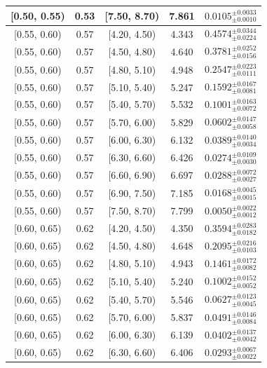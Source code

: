 \begin{longtable}{|c|c|c|c|c|}
\hline
[0.50, 0.55) & 0.53 & [7.50, 8.70) & 7.861 & $0.0105^{ \pm 0.0033 }_{ \pm 0.0010 }$ \\ 
\hline
[0.55, 0.60) & 0.57 & [4.20, 4.50) & 4.343 & $0.4574^{ \pm 0.0344 }_{ \pm 0.0224 }$ \\ 
\hline
[0.55, 0.60) & 0.57 & [4.50, 4.80) & 4.640 & $0.3781^{ \pm 0.0252 }_{ \pm 0.0156 }$ \\ 
\hline
[0.55, 0.60) & 0.57 & [4.80, 5.10) & 4.948 & $0.2547^{ \pm 0.0223 }_{ \pm 0.0111 }$ \\ 
\hline
[0.55, 0.60) & 0.57 & [5.10, 5.40) & 5.247 & $0.1592^{ \pm 0.0167 }_{ \pm 0.0081 }$ \\ 
\hline
[0.55, 0.60) & 0.57 & [5.40, 5.70) & 5.532 & $0.1001^{ \pm 0.0163 }_{ \pm 0.0072 }$ \\ 
\hline
[0.55, 0.60) & 0.57 & [5.70, 6.00) & 5.829 & $0.0602^{ \pm 0.0147 }_{ \pm 0.0058 }$ \\ 
\hline
[0.55, 0.60) & 0.57 & [6.00, 6.30) & 6.132 & $0.0389^{ \pm 0.0140 }_{ \pm 0.0034 }$ \\ 
\hline
[0.55, 0.60) & 0.57 & [6.30, 6.60) & 6.426 & $0.0274^{ \pm 0.0109 }_{ \pm 0.0030 }$ \\ 
\hline
[0.55, 0.60) & 0.57 & [6.60, 6.90) & 6.697 & $0.0288^{ \pm 0.0072 }_{ \pm 0.0027 }$ \\ 
\hline
[0.55, 0.60) & 0.57 & [6.90, 7.50) & 7.185 & $0.0168^{ \pm 0.0045 }_{ \pm 0.0015 }$ \\ 
\hline
[0.55, 0.60) & 0.57 & [7.50, 8.70) & 7.799 & $0.0050^{ \pm 0.0022 }_{ \pm 0.0012 }$ \\ 
\hline
[0.60, 0.65) & 0.62 & [4.20, 4.50) & 4.350 & $0.3594^{ \pm 0.0283 }_{ \pm 0.0182 }$ \\ 
\hline
[0.60, 0.65) & 0.62 & [4.50, 4.80) & 4.648 & $0.2095^{ \pm 0.0216 }_{ \pm 0.0103 }$ \\ 
\hline
[0.60, 0.65) & 0.62 & [4.80, 5.10) & 4.943 & $0.1461^{ \pm 0.0172 }_{ \pm 0.0082 }$ \\ 
\hline
[0.60, 0.65) & 0.62 & [5.10, 5.40) & 5.240 & $0.1002^{ \pm 0.0152 }_{ \pm 0.0052 }$ \\ 
\hline
[0.60, 0.65) & 0.62 & [5.40, 5.70) & 5.546 & $0.0627^{ \pm 0.0123 }_{ \pm 0.0045 }$ \\ 
\hline
[0.60, 0.65) & 0.62 & [5.70, 6.00) & 5.837 & $0.0491^{ \pm 0.0146 }_{ \pm 0.0084 }$ \\ 
\hline
[0.60, 0.65) & 0.62 & [6.00, 6.30) & 6.139 & $0.0402^{ \pm 0.0137 }_{ \pm 0.0042 }$ \\ 
\hline
[0.60, 0.65) & 0.62 & [6.30, 6.60) & 6.406 & $0.0293^{ \pm 0.0067 }_{ \pm 0.0022 }$ \\ 

\end{longtable}
